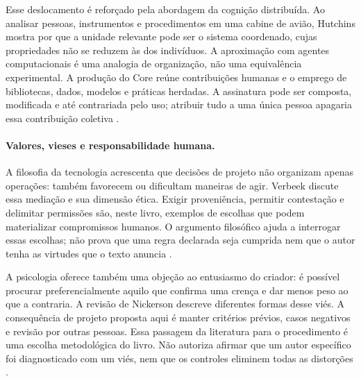 Esse deslocamento é reforçado pela abordagem da cognição distribuída. Ao analisar
pessoas, instrumentos e procedimentos em uma cabine de avião, Hutchins mostra
por que a unidade relevante pode ser o sistema coordenado, cujas propriedades
não se reduzem às dos indivíduos. A aproximação com agentes computacionais é
uma analogia de organização, não uma equivalência experimental. A produção do Core reúne
contribuições humanas e o emprego de bibliotecas, dados, modelos e práticas
herdadas. A assinatura pode ser composta, modificada e até contrariada pelo
uso; atribuir tudo a uma única pessoa apagaria essa contribuição coletiva
.

\paragraph{Valores, vieses e responsabilidade humana.}
A filosofia da tecnologia acrescenta que decisões de projeto não organizam
apenas operações: também favorecem ou dificultam maneiras de agir. Verbeek
discute essa mediação e sua dimensão ética. Exigir proveniência, permitir
contestação e delimitar permissões são, neste livro, exemplos de escolhas que
podem materializar compromissos humanos. O argumento filosófico ajuda a
interrogar essas escolhas; não prova que uma regra declarada seja cumprida nem
que o autor tenha as virtudes que o texto anuncia
.

A psicologia oferece também uma objeção ao entusiasmo do criador: é possível
procurar preferencialmente aquilo que confirma uma crença e dar menos peso ao
que a contraria. A revisão de Nickerson descreve diferentes formas desse viés.
A consequência de projeto proposta aqui é manter critérios prévios, casos
negativos e revisão por outras pessoas. Essa passagem da literatura para o
procedimento é uma escolha metodológica do livro. Não autoriza afirmar que
um autor específico foi diagnosticado com um viés, nem que os controles
eliminem todas as distorções
.

